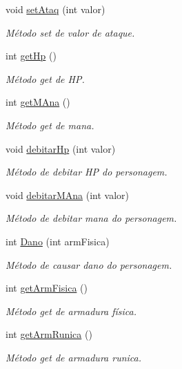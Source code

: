 \begin{DoxyCompactItemize}
void \mbox{\hyperlink{classpersonagem_a5f5f95e0fd8e5ceda996925c37cf6c4f}{set\+Ataq}} (int valor)
\begin{DoxyCompactList}\small\item\em Método set de valor de ataque. \end{DoxyCompactList}\item 
int \mbox{\hyperlink{classpersonagem_aae06914f2a7ab169b55863d5915341b3}{get\+Hp}} ()
\begin{DoxyCompactList}\small\item\em Método get de HP. \end{DoxyCompactList}\item 
int \mbox{\hyperlink{classpersonagem_acb34b3c679e4488e624ea53faf6aef62}{get\+M\+Ana}} ()
\begin{DoxyCompactList}\small\item\em Método get de mana. \end{DoxyCompactList}\item 
void \mbox{\hyperlink{classpersonagem_a71499a8c512467cf812e0bca2b3e2989}{debitar\+Hp}} (int valor)
\begin{DoxyCompactList}\small\item\em Método de debitar HP do personagem. \end{DoxyCompactList}\item 
void \mbox{\hyperlink{classpersonagem_a785a1a249510545caa1d08652351f22c}{debitar\+M\+Ana}} (int valor)
\begin{DoxyCompactList}\small\item\em Método de debitar mana do personagem. \end{DoxyCompactList}\item 
int \mbox{\hyperlink{classpersonagem_ae0c22f0be89d748e1b9c4752b704e80a}{Dano}} (int arm\+Fisica)
\begin{DoxyCompactList}\small\item\em Método de causar dano do personagem. \end{DoxyCompactList}\item 
int \mbox{\hyperlink{classpersonagem_a4a98195a030276936d22931f7ae9f37a}{get\+Arm\+Fisica}} ()
\begin{DoxyCompactList}\small\item\em Método get de armadura física. \end{DoxyCompactList}\item 
int \mbox{\hyperlink{classpersonagem_a1cbd2b54e1727407426a92bf2dcad39f}{get\+Arm\+Runica}} ()
\begin{DoxyCompactList}\small\item\em Método get de armadura runica. \end{DoxyCompactList}\item 

\end{DoxyCompactItemize}
